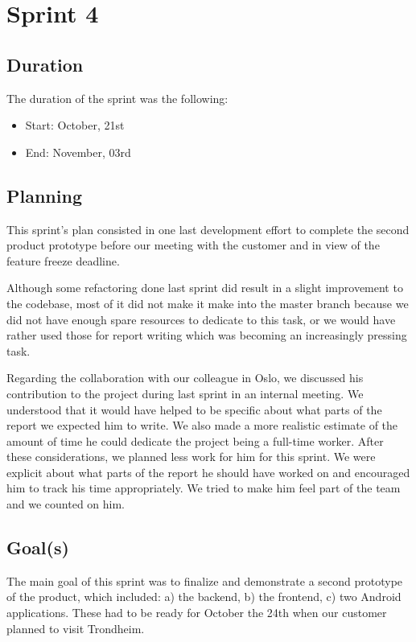 
\chapter{Sprint 4}
\label{Sprint4}

\section{Duration}
The duration of the sprint was the following:
\begin{itemize}
\item Start: October, 21st
\item End: November, 03rd
\end{itemize}

\section{Planning}

This sprint's plan consisted in one last development effort to complete the second product prototype
before our meeting with the customer and in view of the feature freeze deadline.

Although some refactoring done last sprint did result in a slight improvement to the codebase,
most of it did not make it make into the master branch because we did not have enough spare resources
to dedicate to this task, or we would have rather used those for report writing which
was becoming an increasingly pressing task.

Regarding the collaboration with our colleague in Oslo, we discussed his contribution
to the project during last sprint in an internal meeting.
We understood that it would have helped to be specific about what parts
of the report we expected him to write. We also made a more realistic estimate
of the amount of time he could dedicate the project being a full-time worker.
After these considerations, we planned less work for him for this sprint.
We were explicit about what parts of the report he should have worked on and
encouraged him to track his time appropriately.
We tried to make him feel part of the team and we counted on him.

\section{Goal(s)}

The main goal of this sprint was to finalize and demonstrate a second prototype of the product,
which included: a) the backend, b) the frontend, c) two Android applications.
These had to be ready for October the 24th when our customer planned to visit Trondheim.



